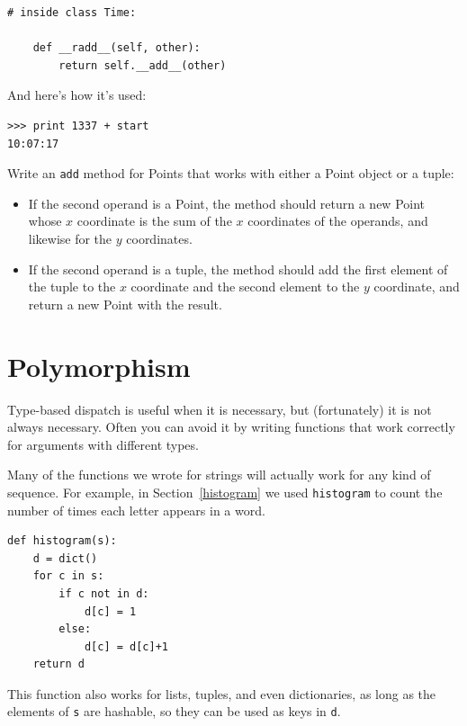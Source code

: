 \documentclass[10pt]{book}
\begin{document}
\begin{verbatim}
# inside class Time:

    def __radd__(self, other):
        return self.__add__(other)
\end{verbatim}
%
And here's how it's used:

\begin{verbatim}
>>> print 1337 + start
10:07:17
\end{verbatim}
%

\begin{exercise}

Write an {\tt add} method for Points that works with either a
Point object or a tuple:

\begin{itemize}

\item If the second operand is a Point, the method should return a new
Point whose $x$ coordinate is the sum of the $x$ coordinates of the
operands, and likewise for the $y$ coordinates.

\item If the second operand is a tuple, the method should add the
first element of the tuple to the $x$ coordinate and the second
element to the $y$ coordinate, and return a new Point with the result.

\end{itemize}

\end{exercise}

\section{Polymorphism}

Type-based dispatch is useful when it is necessary, but (fortunately)
it is not always necessary.  Often you can avoid it by writing functions
that work correctly for arguments with different types.

Many of the functions we wrote for strings will actually
work for any kind of sequence.
For example, in Section~\ref{histogram}
we used {\tt histogram} to count the number of times each letter
appears in a word.

\begin{verbatim}
def histogram(s):
    d = dict()
    for c in s:
        if c not in d:
            d[c] = 1
        else:
            d[c] = d[c]+1
    return d
\end{verbatim}
%
This function also works for lists, tuples, and even dictionaries,
as long as the elements of {\tt s} are hashable, so they can be used
as keys in {\tt d}.
\end{document}
